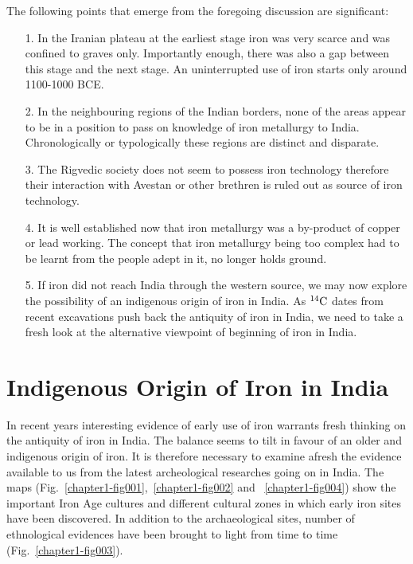 The following points that emerge from the foregoing discussion are significant:
\begin{itemize}
\item[1.]In the Iranian plateau at the earliest stage iron was very scarce and was confined to graves only. Importantly enough, there was also a gap between this stage and the next stage. An uninterrupted use of iron starts only around 1100-1000 BCE.

\item[2.] In the neighbouring regions of the Indian borders, none of the areas appear to be in a position to pass on knowledge of iron metallurgy to India. Chronologically or typologically these regions are distinct and disparate.

\item[3.] The Rigvedic society does not seem to possess iron technology therefore their interaction with Avestan or other brethren is ruled out as source of iron technology.

\item[4.] It is well established now that iron metallurgy was a by-product of copper or lead working. The concept that iron metallurgy being too complex had to be learnt from the people adept in it, no longer holds ground.

\item[5.] If iron did not reach India through the western source, we may now explore the possibility of an indigenous origin of iron in India. As $^{14}{\rm C}$ dates from recent excavations push back the antiquity of iron in India, we need to take a fresh look at the alternative viewpoint of beginning of iron in India.
\end{itemize}

\vspace{-.5cm}

\section*{Indigenous Origin of Iron in India}\label{chapter3-section-2}

\vspace{-.2cm}

In recent years interesting evidence of early use of iron warrants fresh thinking on the antiquity of iron in India. The balance seems to tilt in favour of an older and indigenous origin of iron. It is therefore necessary to examine afresh the evidence available to us from the latest archeological researches going on in India. The maps (Fig.~\ref{chapter1-fig001},~\ref{chapter1-fig002} and ~\ref{chapter1-fig004}) show the important Iron Age cultures and different cultural zones in which early iron sites have been discovered. In addition to the archaeological sites, number of ethnological evidences have been brought to light from time to time (Fig.~\ref{chapter1-fig003}). 

